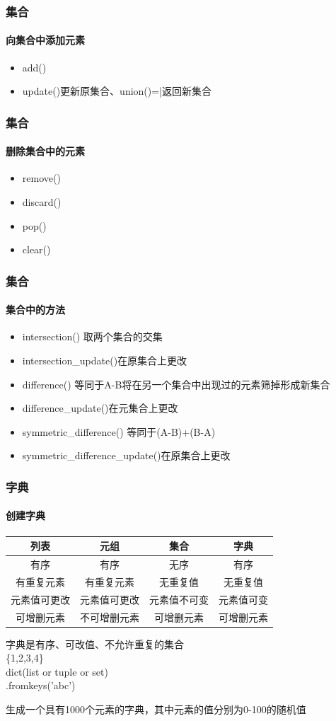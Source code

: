 \documentclass{beamer}
\begin{document}
\begin{frame}[t]
	\frametitle{集合}
	\framesubtitle{向集合中添加元素}
	\begin{itemize}
		\item add()
		\item update()更新原集合、union()=|返回新集合
	\end{itemize}
\end{frame}

\begin{frame}[t]
	\frametitle{集合}
	\framesubtitle{删除集合中的元素}
	\begin{itemize}
		\item remove()
		\item discard()
		\item pop()
		\item clear()
	\end{itemize}
\end{frame}
\begin{frame}[t]
	\frametitle{集合}
	\framesubtitle{集合中的方法}
	\begin{itemize}
		\item intersection() 	取两个集合的交集
		\item intersection\_update()在原集合上更改
		\item difference()	等同于A-B将在另一个集合中出现过的元素筛掉形成新集合
		\item difference\_update()在元集合上更改
		\item symmetric\_difference() 	等同于(A-B)+(B-A)
		\item symmetric\_difference\_update()在原集合上更改

	\end{itemize}


\end{frame}
\begin{frame}[t]
	\frametitle{字典}
	\framesubtitle{创建字典}
	\begin{table}[htpb]
		\centering
		\label{tab:label}
		\begin{tabular}{|c|c|c|c|}
			\hline
			列表     & 元组     & 集合     & 字典    \\
			\hline
			有序     & 有序     & 无序     & 有序    \\
			\hline
			有重复元素  & 有重复元素  & 无重复值   & 无重复值  \\
			\hline
			元素值可更改 & 元素值可更改 & 元素值不可变 & 元素值可变 \\
			\hline
			可增删元素  & 不可增删元素 & 可增删元素  & 可增删元素 \\
			\hline
		\end{tabular}
	\end{table}
	\pause

	字典是有序、可改值、不允许重复的集合\\
	\{1,2,3,4\}\\
	dict(list or tuple or set)\\
	{}.fromkeys('abc')
	\pause
	\begin{example}[1]
		生成一个具有1000个元素的字典，其中元素的值分别为0-100的随机值
	\end{example}
\end{frame}
\end{document}
